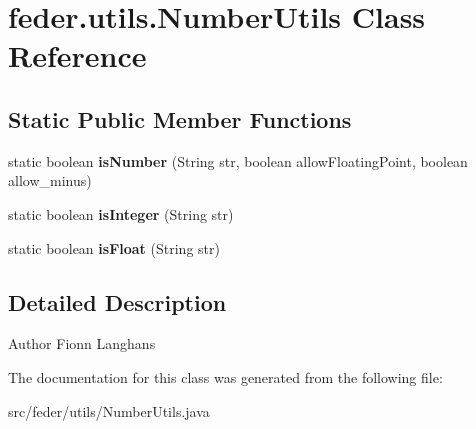 \hypertarget{classfeder_1_1utils_1_1NumberUtils}{}\section{feder.\+utils.\+Number\+Utils Class Reference}
\label{classfeder_1_1utils_1_1NumberUtils}
\subsection*{Static Public Member Functions}
\begin{DoxyCompactItemize}
\item 
\mbox{\label{classfeder_1_1utils_1_1NumberUtils_a034448d59267d5f24b3ff18dc750865a}} 
static boolean {\bfseries is\+Number} (String str, boolean allow\+Floating\+Point, boolean allow\+\_\+minus)
\item 
\mbox{\label{classfeder_1_1utils_1_1NumberUtils_a7b83464f2afd673888bb9b5fb457d204}} 
static boolean {\bfseries is\+Integer} (String str)
\item 
\mbox{\label{classfeder_1_1utils_1_1NumberUtils_a84c970bcdfc885f3dd65ed6184b5e11c}} 
static boolean {\bfseries is\+Float} (String str)
\end{DoxyCompactItemize}


\subsection{Detailed Description}
\begin{DoxyAuthor}{Author}
Fionn Langhans 
\end{DoxyAuthor}


The documentation for this class was generated from the following file\+:\begin{DoxyCompactItemize}
\item 
src/feder/utils/Number\+Utils.\+java\end{DoxyCompactItemize}
